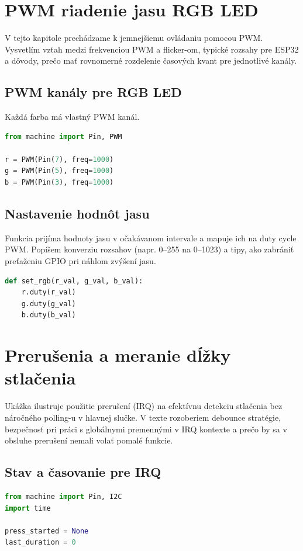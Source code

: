 \clearpage
\section{PWM riadenie jasu RGB LED}
V tejto kapitole prechádzame k jemnejšiemu ovládaniu pomocou PWM. Vysvetlím vzťah medzi frekvenciou PWM a flicker-om, typické rozsahy pre ESP32 a dôvody, prečo mať rovnomerné rozdelenie časových kvant pre jednotlivé kanály.

\subsection*{PWM kanály pre RGB LED}
Každá farba má vlastný PWM kanál.
\begin{lstlisting}[language=Python]
from machine import Pin, PWM

r = PWM(Pin(7), freq=1000)
g = PWM(Pin(5), freq=1000)
b = PWM(Pin(3), freq=1000)
\end{lstlisting}

\subsection*{Nastavenie hodnôt jasu}
Funkcia prijíma hodnoty jasu v očakávanom intervale a mapuje ich na duty cycle PWM. Popíšem konverziu rozsahov (napr. 0–255 na 0–1023) a tipy, ako zabrániť preťaženiu GPIO pri náhlom zvýšení jasu.
\begin{lstlisting}[language=Python]
def set_rgb(r_val, g_val, b_val):
	r.duty(r_val)
	g.duty(g_val)
	b.duty(b_val)
\end{lstlisting}

\clearpage
\section{Prerušenia a meranie dĺžky stlačenia}
Ukážka ilustruje použitie prerušení (IRQ) na efektívnu detekciu stlačenia bez náročného polling-u v hlavnej slučke. V texte rozoberiem debounce stratégie, bezpečnosť pri práci s globálnymi premennými v IRQ kontexte a prečo by sa v obsluhe prerušení nemali volať pomalé funkcie.

\subsection*{Stav a časovanie pre IRQ}
\begin{lstlisting}[language=Python]
from machine import Pin, I2C
import time

press_started = None
last_duration = 0
\end{lstlisting}

